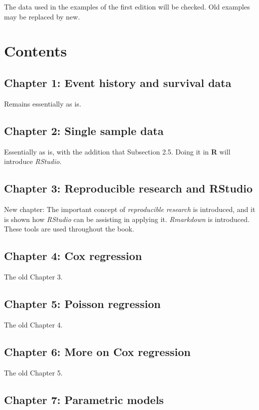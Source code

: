 \documentclass[a4paper,11pt]{article}
\begin{document}
The data used in the examples of the first edition will be checked. Old
examples may be replaced by new.  

\section{Contents} \label{sec:contents}

\subsection*{Chapter 1: Event history and survival data}

Remains essentially as is.

\subsection*{Chapter 2: Single sample data}

Essentially as is, with the addition that Subsection 2.5. Doing it in {\bf
  R} will introduce \emph{RStudio}.

\subsection*{Chapter 3: Reproducible research and RStudio}

New chapter: The important concept of \emph{reproducible research} is
introduced, and it is shown how \emph{RStudio} can be assisting in applying
it. \emph{Rmarkdown} is introduced. These tools are used throughout the
book.

\subsection*{Chapter 4: Cox regression}

The old Chapter 3.

\subsection*{Chapter 5: Poisson regression}

The old Chapter 4.

\subsection*{Chapter 6: More on Cox regression}

The old Chapter 5.

\subsection*{Chapter 7: Parametric models}
\end{document}
